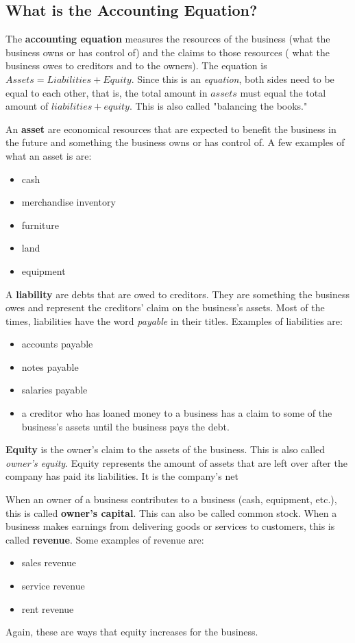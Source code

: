 \documentclass[a4paper, 12pt]{article}
\begin{document}
\subsection{What is the Accounting Equation?}
The \textbf{accounting equation} measures the resources of the business
(what the business owns or has control of) and the claims to those resources (
what the business owes to creditors and to the owners). The equation is $Assets = 
Liabilities + Equity$. Since this is an \emph{equation}, both sides need to be
equal to each other, that is, the total amount in $assets$ must equal the total
amount of $liabilities + equity$. This is also called "balancing the books."

An \textbf{asset} are economical resources that are expected to benefit the
business in the future and something the business owns or has control of. A few
examples of what an asset is are:
\begin{itemize}
    \item cash
    \item merchandise inventory
    \item furniture
    \item land
    \item equipment
\end{itemize}

A \textbf{liability} are debts that are owed to creditors. They are something
the business owes and represent the creditors' claim on the business's assets.
Most of the times, liabilities have the word \emph{payable} in their titles.
Examples of liabilities are:
\begin{itemize}
    \item accounts payable
    \item notes payable
    \item salaries payable
    \item a creditor who has loaned money to a business has a claim to some of
        the business's assets until the business pays the debt.
\end{itemize}

\textbf{Equity} is the owner's claim to the assets of the business. This is also
called \emph{owner's equity}. Equity represents the amount of assets that are
left over after the company has paid its liabilities. It is the company's net


When an owner of a business contributes to a business (cash, equipment, etc.), 
this is called \textbf{owner's capital}. This can also be called common stock.
When a business makes earnings from delivering goods or services to customers,
this is called \textbf{revenue}. Some examples of revenue are:
\begin{itemize}
    \item sales revenue
    \item service revenue
    \item rent revenue
\end{itemize}
Again, these are ways that equity increases for the business.
\end{document}
